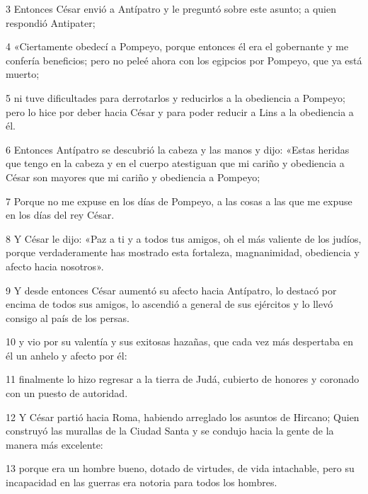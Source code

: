 \par 3 Entonces César envió a Antípatro y le preguntó sobre este asunto; a quien respondió Antipater;

\par 4 «Ciertamente obedecí a Pompeyo, porque entonces él era el gobernante y me confería beneficios; pero no peleé ahora con los egipcios por Pompeyo, que ya está muerto;

\par 5 ni tuve dificultades para derrotarlos y reducirlos a la obediencia a Pompeyo; pero lo hice por deber hacia César y para poder reducir a Lins a la obediencia a él.

\par 6 Entonces Antípatro se descubrió la cabeza y las manos y dijo: «Estas heridas que tengo en la cabeza y en el cuerpo atestiguan que mi cariño y obediencia a César son mayores que mi cariño y obediencia a Pompeyo;

\par 7 Porque no me expuse en los días de Pompeyo, a las cosas a las que me expuse en los días del rey César.

\par 8 Y César le dijo: «Paz a ti y a todos tus amigos, oh el más valiente de los judíos, porque verdaderamente has mostrado esta fortaleza, magnanimidad, obediencia y afecto hacia nosotros».

\par 9 Y desde entonces César aumentó su afecto hacia Antípatro, lo destacó por encima de todos sus amigos, lo ascendió a general de sus ejércitos y lo llevó consigo al país de los persas.

\par 10 y vio por su valentía y sus exitosas hazañas, que cada vez más despertaba en él un anhelo y afecto por él:

\par 11 finalmente lo hizo regresar a la tierra de Judá, cubierto de honores y coronado con un puesto de autoridad.

\par 12 Y César partió hacia Roma, habiendo arreglado los asuntos de Hircano; Quien construyó las murallas de la Ciudad Santa y se condujo hacia la gente de la manera más excelente:

\par 13 porque era un hombre bueno, dotado de virtudes, de vida intachable, pero su incapacidad en las guerras era notoria para todos los hombres.


